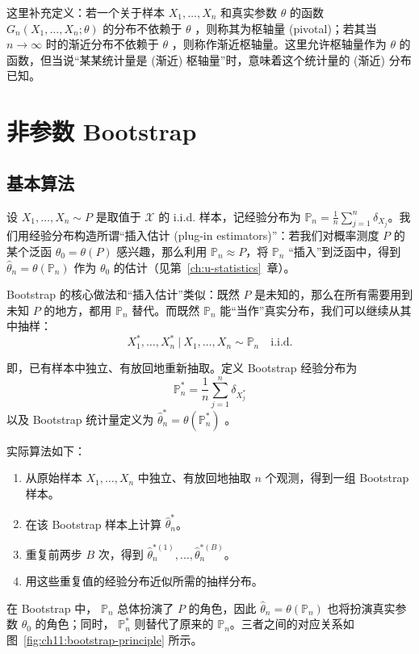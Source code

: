 这里补充定义：若一个关于样本 $X_1,\dots,X_n$ 和真实参数 $\theta$ 的函数 $G_n(X_1,\dots,X_n;\theta)$ 的分布不依赖于 $\theta$ ，则称其为枢轴量 (pivotal)；若其当 $n\to\infty$ 时的渐近分布不依赖于 $\theta$ ，则称作渐近枢轴量。这里允许枢轴量作为 $\theta$ 的函数，但当说``某某统计量是 (渐近) 枢轴量''时，意味着这个统计量的 (渐近) 分布已知。

\section{非参数 Bootstrap}

\subsection{基本算法}

设 $X_1,\ldots,X_n\sim P$ 是取值于 $\mathscr X$ 的 i.i.d. 样本，记经验分布为 $\mathbb P_n=\frac{1}{n}\sum_{j=1}^n\delta_{X_j}$。我们用经验分布构造所谓``插入估计 (plug-in estimators)''：若我们对概率测度 $P$ 的某个泛函 $\theta_0=\theta(P)$ 感兴趣，那么利用 $\mathbb P_n\approx P$，将 $\mathbb P_n$ ``插入''到泛函中，得到 $\widehat\theta_n=\theta(\mathbb P_n)$ 作为 $\theta_0$ 的估计（见第~\ref{ch:u-statistics}~章）。

Bootstrap 的核心做法和``插入估计''类似：既然 $P$ 是未知的，那么在所有需要用到未知 $P$ 的地方，都用 $\mathbb P_n$ 替代。而既然 $\mathbb P_n$ 能``当作''真实分布，我们可以继续从其中抽样：
\[
X_1^*,\ldots,X_n^* \ \big|\  X_1,\ldots,X_n \sim \mathbb P_n\quad\text{i.i.d.}
\]

即，已有样本中独立、有放回地重新抽取。定义 Bootstrap 经验分布为
\[ \mathbb P_n^*=\frac{1}{n}\sum_{j=1}^n\delta_{X_j^*} \]以及 Bootstrap 统计量定义为 $\widehat{\theta}_n^*=\theta(\mathbb P_n^*)$ 。

实际算法如下：

\begin{enumerate}
\def\labelenumi{\arabic{enumi}.}
\tightlist
\item
  从原始样本 $X_1,\dots,X_n$ 中独立、有放回地抽取 $n$ 个观测，得到一组 Bootstrap 样本。
\item
  在该 Bootstrap 样本上计算 $\widehat{\theta}_n^*$。
\item
  重复前两步 $B$ 次，得到 $\widehat{\theta}_n^{*(1)},\ldots,\widehat{\theta}_n^{*(B)}$。
\item
  用这些重复值的经验分布近似所需的抽样分布。
\end{enumerate}

在 Bootstrap 中， $\mathbb P_n$ 总体扮演了 $P$ 的角色，因此 $\widehat{\theta}_n=\theta(\mathbb P_n)$ 也将扮演真实参数 $\theta_0$ 的角色；同时， $\mathbb P_n^*$ 则替代了原来的 $\mathbb P_n$。三者之间的对应关系如图~\ref{fig:ch11:bootstrap-principle} 所示。

